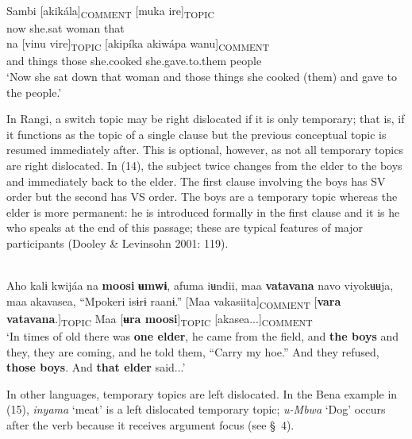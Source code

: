 \documentclass[output=paper]{langsci/langscibook}
\begin{document}
\ea\label{ex:}
\\
\gll Sambi [akikála]\textsubscript{COMMENT} [muka ire]\textsubscript{TOPIC}\\
now she.sat woman that \\


\gll na [vinu vire]\textsubscript{TOPIC} [akipíka akiwápa wanu]\textsubscript{COMMENT}\\
and things those she.cooked she.gave.to.them people \\


\glt \textup{‘}\textup{Now she sat down that woman and those things she cooked (them) and gave to the people.’}
\z

In Rangi, a switch topic may be right dislocated if it is only temporary; that is, if it functions as the topic of a single clause but the previous conceptual topic is resumed immediately after. This is optional, however, as not all temporary topics are right dislocated. In (14), the subject twice changes from the elder to the boys and immediately back to the elder. The first clause involving the boys has SV order but the second has VS order. The boys are a temporary topic whereas the elder is more permanent: he is introduced formally in the first clause and it is he who speaks at the end of this passage; these are typical features of major participants (Dooley \& Levinsohn 2001: 119).

\ea\label{ex:}
\\
Aho kalɨ kwijáa na \textbf{moosi }\textbf{ʉ}\textbf{mw}\textbf{ɨ}, afuma iʉndii, maa \textbf{vatavana} navo viyokʉʉja, maa akavasea, “Mpokeri isɨrɨ raanɨ.” [Maa vakasiita]\textsubscript{COMME}\textsubscript{NT} [\textbf{vara vatavana}.]\textsubscript{TOPIC} Maa [\textbf{ʉ}\textbf{ra moosi}]\textsubscript{TOPIC} [akasea...]\textsubscript{COMMENT}\\
\glt \textup{‘}\textup{In times of old there was }\textbf{\textup{one elder}}\textup{, he came from the field, and }\textbf{\textup{the boys}}\textup{ and they, they are coming, and he told them, “Carry my hoe.” And }\textup{they refused, }\textbf{\textup{those boys}}\textup{. And }\textbf{\textup{that elder}}\textup{ said...’}
\z

In other languages, temporary topics are left dislocated. In the Bena example in (15), \emph{inyama} ‘meat’ is a left dislocated temporary topic; \textit{u}\textit{\nobreakdash-Mbwa} ‘Dog’ occurs after the verb because it receives argument focus (see §~4).
\end{document}
